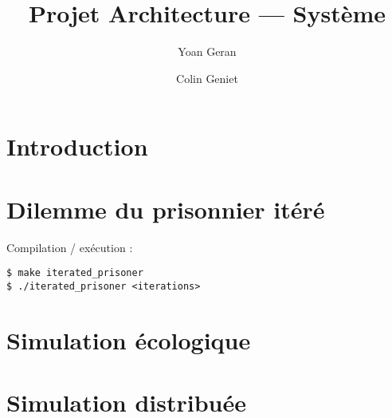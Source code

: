 \documentclass[11pt]{article}
\title{Projet Architecture --- Système}
\author{Yoan Geran \and Colin Geniet}
\begin{document}
\maketitle
\tableofcontents

\section*{Introduction}

\section{Dilemme du prisonnier itéré}
Compilation / exécution :
\begin{verbatim}
$ make iterated_prisoner
$ ./iterated_prisoner <iterations>
\end{verbatim}

\section{Simulation écologique}

\section{Simulation distribuée}
\end{document}
